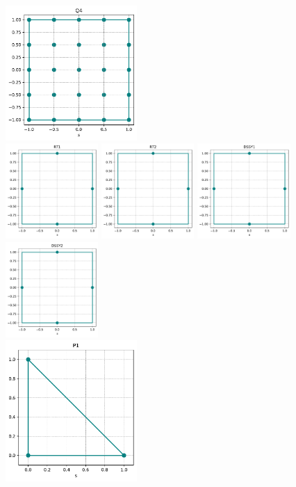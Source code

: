 \begin{center}
\includegraphics[width=5cm]{python_codes/fieldstone_120/spaces/Q4_nodes}\\
\includegraphics[width=3.53cm]{python_codes/fieldstone_120/spaces/RT1_nodes}
\includegraphics[width=3.53cm]{python_codes/fieldstone_120/spaces/RT2_nodes}
\includegraphics[width=3.53cm]{python_codes/fieldstone_120/spaces/DSSY1_nodes}
\includegraphics[width=3.53cm]{python_codes/fieldstone_120/spaces/DSSY2_nodes}\\
\includegraphics[width=5cm]{python_codes/fieldstone_120/spaces/P1_nodes}

\end{center}
